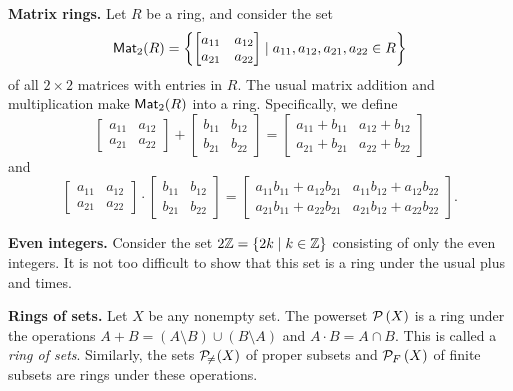 \begin{examples}
\item \textbf{Matrix rings.} Let \(R\) be a ring, and consider the set \[ \mathsf{Mat}_{2}(R) = \left\{ \begin{bmatrix} a_{11} & a_{12} \\ a_{21} & a_{22} \end{bmatrix} \mid a_{11}, a_{12}, a_{21}, a_{22} \in R \right\} \] of all \(2 \times 2\) matrices with entries in \(R\).
The usual matrix addition and multiplication make \(\mathsf{Mat}_{2}(R)\) into a ring.
Specifically, we define \[\begin{bmatrix} a_{11} & a_{12} \\ a_{21} & a_{22} \end{bmatrix} + \begin{bmatrix} b_{11} & b_{12} \\ b_{21} & b_{22} \end{bmatrix} = \begin{bmatrix} a_{11} + b_{11} & a_{12} + b_{12} \\ a_{21} + b_{21} & a_{22} + b_{22} \end{bmatrix}\] and \[\begin{bmatrix} a_{11} & a_{12} \\ a_{21} & a_{22} \end{bmatrix} \cdot \begin{bmatrix} b_{11} & b_{12} \\ b_{21} & b_{22} \end{bmatrix} = \begin{bmatrix} a_{11}b_{11} + a_{12}b_{21} & a_{11}b_{12} + a_{12}b_{22} \\ a_{21}b_{11} + a_{22}b_{21} & a_{21}b_{12} + a_{22}b_{22} \end{bmatrix}.\]

\item \textbf{Even integers.} Consider the set \(2\mathbb{Z} = \{ 2k \mid k \in \mathbb{Z} \}\) consisting of only the even integers.
It is not too difficult to show that this set is a ring under the usual plus and times.

\item \textbf{Rings of sets.} \label{examp:rings-of-sets} Let \(X\) be any nonempty set.
The powerset \(\mathcal{P}\left(X\right)\) is a ring under the operations \(A + B = (A \setminus B) \cup (B \setminus A)\) and \(A \cdot B = A \cap B\).
This is called a \emph{ring of sets}.
Similarly, the sets \(\mathcal{P}_{\!\neq\!}\left(X\right)\) of proper subsets and \(\mathcal{P}_F\left(X\right)\) of finite subsets are rings under these operations.
\end{examples}

